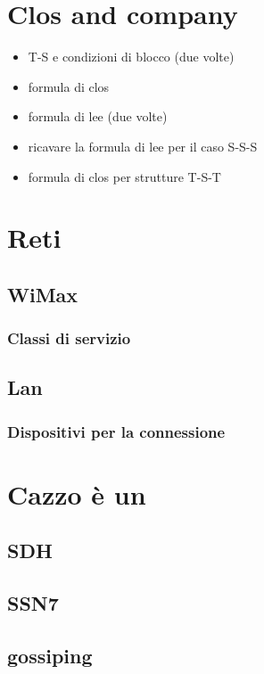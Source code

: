 \documentclass[11pt]{article}
\author{Biggie Dickus}
\date{\today}
\title{}
\begin{document}
\tableofcontents

\section{Clos and company}
\label{sec:org86bef48}
\begin{itemize}
\item T-S e condizioni di blocco (due volte)
\item formula di clos
\item formula di lee (due volte)
\item ricavare la formula di lee per il caso S-S-S
\item formula di clos per strutture T-S-T
\end{itemize}

\section{Reti}
\label{sec:org022ab86}
\subsection{WiMax}
\label{sec:org13e8d85}
\subsubsection{Classi di servizio}
\label{sec:orgfdac13a}
\subsection{Lan}
\label{sec:orgffd1b31}
\subsubsection{Dispositivi per la connessione}
\label{sec:orgc2ac271}

\section{Cazzo è un}
\label{sec:org3d7d984}
\subsection{SDH}
\label{sec:org8d8c72d}
\subsection{SSN7}
\label{sec:org78a3fa0}
\subsection{gossiping}
\label{sec:orgf2f9a4f}
\end{document}
